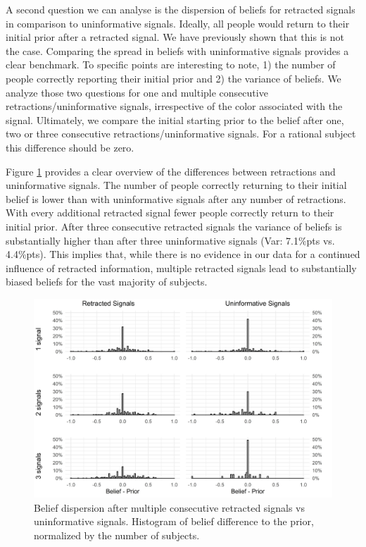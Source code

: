 \documentclass{article}
\begin{document}
A second question we can analyse is the dispersion of beliefs for retracted signals in comparison to uninformative signals. Ideally, all people would return to their initial prior after a retracted signal. We have previously shown that this is not the case. Comparing the spread in beliefs with uninformative signals provides a clear benchmark. To specific points are interesting to note, 1) the number of people correctly reporting their initial prior and 2) the variance of beliefs. We analyze those two questions for one and multiple consecutive retractions/uninformative signals, irrespective of the color associated with the signal. Ultimately, we compare the initial starting prior to the belief after one, two or three consecutive retractions/uninformative signals. For a rational subject this difference should be zero.

Figure \ref{fig:variance_retract_uninformative} provides a clear overview of the differences between retractions and uninformative signals. The number of people correctly returning to their initial belief is lower than with uninformative signals after any number of retractions. With every additional retracted signal fewer people correctly return to their initial prior. After three consecutive retracted signals the variance of beliefs is substantially higher than after three uninformative signals (Var: 7.1\%pts vs. 4.4\%pts). This implies that, while there is no evidence in our data for a continued influence of retracted information, multiple retracted signals lead to substantially biased beliefs for the vast majority of subjects.

\begin{figure}[!htb]
    \centering
    \includegraphics[width=12cm]{Fig/02_fig_variance_retract_uninf.jpg}
    \caption{Belief dispersion after multiple consecutive retracted signals vs uninformative signals. Histogram of belief difference to the prior, normalized by the number of subjects.}
    \label{fig:variance_retract_uninformative}
\end{figure}
\end{document}
